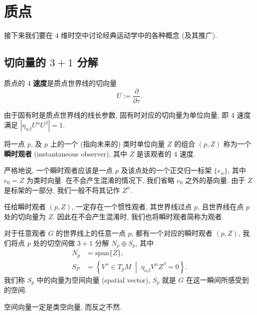 \section{质点}
接下来我们要在 $ 4 $ 维时空中讨论经典运动学中的各种概念 (及其推广).
\subsection{切向量的 \texorpdfstring{$ 3+1 $}{3+1} 分解}
\begin{definition}[$ 4 $ 速度]
    质点的 $ 4 $ {\bf 速度}是质点世界线的切向量
    \[ U:=\frac{\partial}{\partial\tau}. \]
\end{definition}
由于固有时是质点世界线的线长参数, 固有时对应的切向量为单位向量, 即 $ 4 $ 速度满足 $ |\eta_{\alpha\beta}U^\alpha U^\beta|=1 $.

将一点 $ p $, 及 $ p $ 上的一个 (指向未来的) 类时单位向量 $ Z $ 的组合 $ (p,Z) $ 称为一个{\bf 瞬时观者} (instantaneous observer), 其中 $Z$ 是该观者的 $4$ 速度.  
\begin{remark}
    严格地说, 一个瞬时观者应该是一点 $ p $ 及该点处的一个正交归一标架 $ \{e_\alpha\} $, 其中 $ e_0=Z $ 为类时向量. 在不会产生混淆的情况下, 我们省略 $ e_0 $ 之外的基向量. 由于 $Z$ 是标架的一部分, 我们一般不将其记作 $Z^\alpha$.
\end{remark}
\begin{remark}
    任给瞬时观者 $(p,Z)$, 一定存在一个惯性观者, 其世界线过点 $p$, 且世界线在点 $p$ 处的切向量为 $Z$. 因此在不会产生混淆时, 我们也将瞬时观者简称为观者.
\end{remark}

\begin{definition}[切空间的 $3+1$ 分解]
    对于任意观者 $G$ 的世界线上的任意一点 $ p $, 都有一个对应的瞬时观者 $ (p,Z) $, 我们将点 $ p $ 处的切空间做 $ 3+1 $ 分解 $ N_p\oplus S_p $, 其中
    \begin{align*}
        N_p&=\mathrm{span}\{Z\},\\
        S_P&=\left\{ V^{\alpha}\in T_pM \;\middle|\; \eta_{\alpha\beta}V^\alpha Z^\beta=0 \right\}.
    \end{align*}
    我们称 $ S_p $ 中的向量为空间向量 (spatial vector), $ S_p $ 就是 $ G $ 在这一瞬间所感受到的空间. 
\end{definition}

\begin{remark}
    空间向量一定是类空向量, 而反之不然.
\end{remark}

